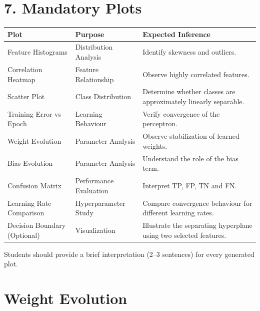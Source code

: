 \documentclass[11pt]{article}
\begin{document}

\section*{7. Mandatory Plots}

\begin{longtable}{|p{3.4cm}|p{3.4cm}|p{6cm}|}
\hline
\textbf{Plot} & \textbf{Purpose} & \textbf{Expected Inference}\\
\hline
Feature Histograms & Distribution Analysis & Identify skewness and outliers.\\
\hline
Correlation Heatmap & Feature Relationship & Observe highly correlated features.\\
\hline
Scatter Plot & Class Distribution & Determine whether classes are approximately linearly separable.\\
\hline
Training Error vs Epoch & Learning Behaviour & Verify convergence of the perceptron.\\
\hline
Weight Evolution & Parameter Analysis & Observe stabilization of learned weights.\\
\hline
Bias Evolution & Parameter Analysis & Understand the role of the bias term.\\
\hline
Confusion Matrix & Performance Evaluation & Interpret TP, FP, TN and FN.\\
\hline
Learning Rate Comparison & Hyperparameter Study & Compare convergence behaviour for different learning rates.\\
\hline
Decision Boundary (Optional) & Visualization & Illustrate the separating hyperplane using two selected features.\\
\hline
\end{longtable}

Students should provide a brief interpretation (2--3 sentences) for every generated plot.

\section{Weight Evolution}
\end{document}
